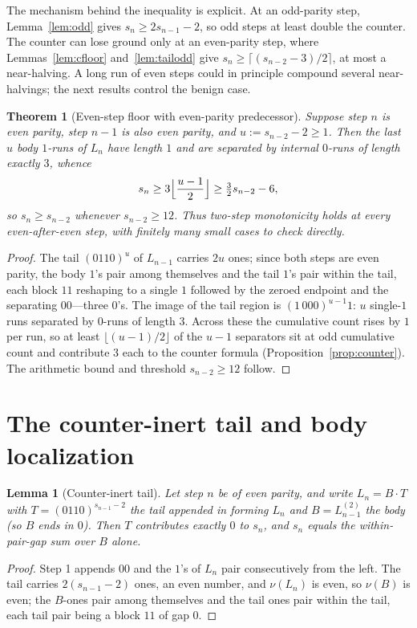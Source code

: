 \documentclass[11pt,reqno]{amsart}
\theoremstyle{plain}
\newtheorem{thm}[theorem]{Theorem}
\newtheorem{lemma}{Lemma}
\theoremstyle{definition}
\theoremstyle{remark}
\begin{document}
The mechanism behind the inequality is explicit. At an odd-parity step, Lemma~\ref{lem:odd} gives $s_n\ge 2s_{n-1}-2$, so odd steps at least double the counter. The counter can lose ground only at an even-parity step, where Lemmas~\ref{lem:cfloor} and~\ref{lem:tailodd} give $s_n\ge\lceil(s_{n-2}-3)/2\rceil$, at most a near-halving. A long run of even steps could in principle compound several near-halvings; the next results control the benign case.

\begin{thm}[Even-step floor with even-parity predecessor]\label{thm:floor}
Suppose step $n$ is even parity, step $n-1$ is also even parity, and $u:=s_{n-2}-2\ge 1$. Then the last $u$ body $1$-runs of $L_n$ have length $1$ and are separated by internal $0$-runs of length exactly $3$, whence
\[ s_n\ge 3\Bigl\lfloor\frac{u-1}{2}\Bigr\rfloor\ge \tfrac32 s_{n-2}-6, \]
so $s_n\ge s_{n-2}$ whenever $s_{n-2}\ge 12$. Thus two-step monotonicity holds at every even-after-even step, with finitely many small cases to check directly.
\end{thm}
\begin{proof}
The tail $(0110)^u$ of $L_{n-1}$ carries $2u$ ones; since both steps are even parity, the body $1$'s pair among themselves and the tail $1$'s pair within the tail, each block $11$ reshaping to a single $1$ followed by the zeroed endpoint and the separating $00$---three $0$'s. The image of the tail region is $(1\,000)^{u-1}1$: $u$ single-$1$ runs separated by $0$-runs of length $3$. Across these the cumulative count rises by $1$ per run, so at least $\lfloor(u-1)/2\rfloor$ of the $u-1$ separators sit at odd cumulative count and contribute $3$ each to the counter formula (Proposition~\ref{prop:counter}). The arithmetic bound and threshold $s_{n-2}\ge 12$ follow.
\end{proof}

\section{The counter-inert tail and body localization}\label{sec:inert}
\begin{lemma}[Counter-inert tail]\label{lem:inert}
Let step $n$ be of even parity, and write $L_n=B\cdot T$ with $T=(0110)^{s_{n-1}-2}$ the tail appended in forming $L_n$ and $B=L^{(2)}_{n-1}$ the body (so $B$ ends in $0$). Then $T$ contributes exactly $0$ to $s_n$, and $s_n$ equals the within-pair-gap sum over $B$ alone.
\end{lemma}
\begin{proof}
Step 1 appends $00$ and the $1$'s of $L_n$ pair consecutively from the left. The tail carries $2(s_{n-1}-2)$ ones, an even number, and $\nu(L_n)$ is even, so $\nu(B)$ is even; the $B$-ones pair among themselves and the tail ones pair within the tail, each tail pair being a block $11$ of gap $0$.
\end{proof}
\end{document}
